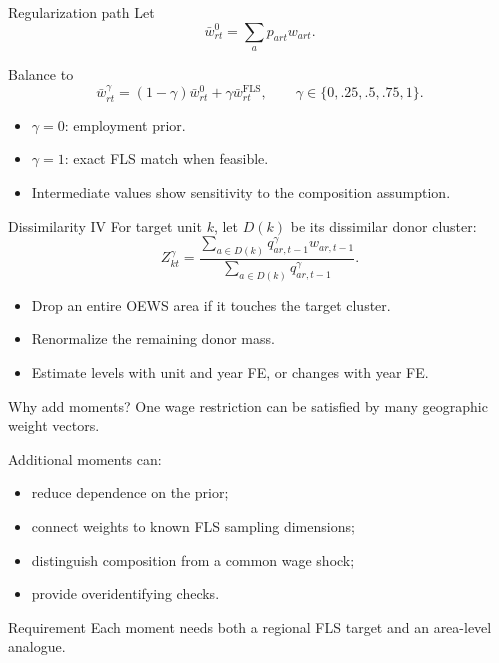 \documentclass[aspectratio=169,11pt]{beamer}
\newcommand{\FLS}{\mathrm{FLS}}
\begin{document}
\begin{frame}{Regularization path}
  Let
  \[
    \bar w^0_{rt}=\sum_a p_{art}w_{art}.
  \]

  Balance to
  \[
    \bar w^\gamma_{rt}
      =(1-\gamma)\bar w^0_{rt}+\gamma\bar w^{\FLS}_{rt},
    \qquad
    \gamma\in\{0,.25,.5,.75,1\}.
  \]

  \begin{itemize}
    \item $\gamma=0$: employment prior.
    \item $\gamma=1$: exact FLS match when feasible.
    \item Intermediate values show sensitivity to the composition assumption.
  \end{itemize}
\end{frame}

\begin{frame}{Dissimilarity IV}
  For target unit $k$, let $D(k)$ be its dissimilar donor cluster:
  \[
    Z^\gamma_{kt}
      =\frac{\sum_{a\in D(k)}q^\gamma_{ar,t-1}w_{ar,t-1}}
      {\sum_{a\in D(k)}q^\gamma_{ar,t-1}}.
  \]

  \begin{itemize}
    \item Drop an entire OEWS area if it touches the target cluster.
    \item Renormalize the remaining donor mass.
    \item Estimate levels with unit and year FE, or changes with year FE.
  \end{itemize}
\end{frame}

\begin{frame}{Why add moments?}
  One wage restriction can be satisfied by many geographic weight vectors.

  Additional moments can:
  \begin{itemize}
    \item reduce dependence on the prior;
    \item connect weights to known FLS sampling dimensions;
    \item distinguish composition from a common wage shock;
    \item provide overidentifying checks.
  \end{itemize}

  \begin{alertblock}{Requirement}
    Each moment needs both a regional FLS target and an area-level analogue.
  \end{alertblock}
\end{frame}
\end{document}
